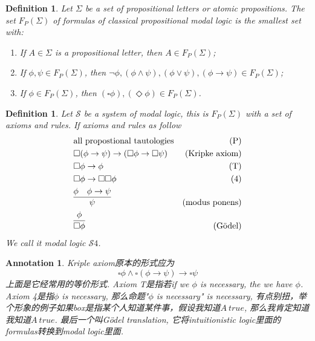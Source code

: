 \documentclass{article}
\theoremstyle{plain}
\newtheorem{definition}[theorem]{Definition}
\newtheorem{annotation}[theorem]{Annotation}
\theoremstyle{nonumberplain}
\begin{document}
\begin{definition}
\rm \cite{15-816-cml}Let $\Sigma$ be a set of propositional letters or atomic propositions. The set $F_P(\Sigma)$ of formulas of classical propositional modal logic is the smallest set with:
\begin{enumerate}
	\item If $A \in \Sigma$ is a propositional letter, then $A \in F_P(\Sigma)$;
	\item If $\phi,\psi \in F_P(\Sigma)$, then $\neg \phi, (\phi \wedge \psi), (\phi \vee \psi), (\phi \to \psi) \in F_P(\Sigma)$;
	\item If $\phi \in F_P(\Sigma)$, then $(\square \phi),(\Diamond \phi) \in F_P(\Sigma)$. 
\end{enumerate}
\end{definition}

\begin{definition}
\rm Let $\mathcal{S}$ be a system of modal logic, this is $F_P(\Sigma)$ with a set of axioms and rules. If axioms and rules as follow
$$
\begin{aligned}
&\text{all propostional tautologies}&(\text{P}) \\
&\square(\phi \to \psi) \to (\square\phi \to \square\psi)& (\text{Kripke axiom})\\
&\square\phi \to \phi & (\text{T}) \\
&\square\phi \to \square\square\phi &(4) \\
&\infer{\psi}{\phi & \phi \to \psi} & (\text{modus ponens})\\
&\infer{\square \phi}{\phi} & (\text{G\"{o}del}) 
\end{aligned}
$$
We call it modal logic $\mathcal{S}4$.
\end{definition}


\begin{annotation}
\rm Kriple axiom原本的形式应为
$$
\square \phi \wedge \square(\phi \to \psi) \to \square \psi
$$
上面是它经常用的等价形式. Axiom T是指若if we $\phi$ is necessary, the we have $\phi$. Axiom 4是指$\phi$ is necessary, 那么命题"$\phi$ is necessary" is necessary, 有点别扭，举个形象的例子如果box是指某个人知道某件事，假设我知道$A~true$, 那么我肯定知道我知道$A~true$. 最后一个叫G\"{o}del translation, 它将intuitionistic logic里面的formulas转换到modal logic里面. 
\end{annotation}
\end{document}
